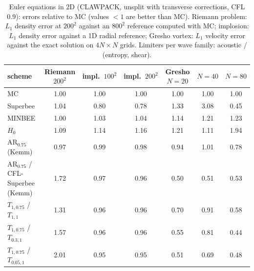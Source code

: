 \begin{table}[t]\centering\footnotesize\setlength{\tabcolsep}{3.5pt}
\caption{Euler equations in 2D (CLAWPACK, unsplit with transverse corrections, CFL $0.9$): errors relative to MC (values $<1$ are better than MC). Riemann problem: $L_1$ density error at $200^2$ against an $800^2$ reference computed with MC; implosion: $L_1$ density error against a 1D radial reference; Gresho vortex: $L_1$ velocity error against the exact solution on $4N\times N$ grids. Limiters per wave family: acoustic / (entropy, shear).}\label{tab:euler2d}
\begin{tabular}{lcccccc}\toprule
scheme & Riemann $200^2$ & impl.\ $100^2$ & impl.\ $200^2$ & Gresho $N=20$ & $N=40$ & $N=80$ \\ \midrule
MC & 1.00 & 1.00 & 1.00 & 1.00 & 1.00 & 1.00 \\
Superbee & 1.04 & 0.80 & 0.78 & 1.33 & 3.08 & 0.45 \\
MINBEE & 1.00 & 1.03 & 1.04 & 1.14 & 1.21 & 1.23 \\
$H_0$ & 1.09 & 1.14 & 1.16 & 1.21 & 1.11 & 1.94 \\
AR$_{0.75}$ (Kemm) & 0.97 & 0.99 & 0.98 & 0.94 & 1.01 & 0.78 \\
AR$_{0.75}$ / CFL-Superbee (Kemm) & 1.72 & 0.97 & 0.96 & 0.50 & 0.51 & 0.53 \\
$T_{1,0.75}$ / $T_{1,1}$ & 1.31 & 0.96 & 0.96 & 0.70 & 0.91 & 0.58 \\
$T_{1,0.75}$ / $T_{0.3,1}$ & 1.57 & 0.96 & 0.96 & 0.55 & 0.81 & 0.44 \\
$T_{1,0.75}$ / $T_{0.05,1}$ & 2.01 & 0.95 & 0.95 & 0.51 & 0.69 & 0.48 \\
\bottomrule\end{tabular}\end{table}
